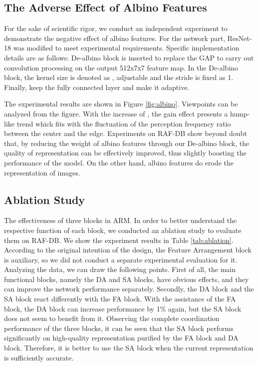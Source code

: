 \documentclass[10pt,twocolumn,letterpaper]{article}
\begin{document}
\subsection{The Adverse Effect of Albino Features}

	For the sake of scientific rigor, we conduct an independent experiment to demonstrate the negative effect of albino features. For the network part, ResNet-18 \cite{resnet} was modified to meet experimental requirements. Specific implementation details are as follows: De-albino block is inserted to replace the GAP to carry out convolution processing on the output 512x7x7 feature map. In the De-albino block, the kernel size is denoted as , adjustable and the stride is fixed as 1. Finally, keep the fully connected layer and make it adaptive. 

	The experimental results are shown in Figure \ref{fig:albino}. Viewpoints can be analyzed from the figure. With the increase of , the gain effect presents a hump-like trend which fits with the fluctuation of the perception frequency ratio between the center and the edge. Experiments on RAF-DB show beyond doubt that, by reducing the weight of albino features through our De-albino block, the quality of representation can be effectively improved, thus slightly boosting the performance of the model. On the other hand, albino features do erode the representation of images.








\subsection{Ablation Study}
	The effectiveness of three blocks in ARM. In order to better understand the respective function of each block, we conducted an ablation study to evaluate them on RAF-DB. We show the experiment results in Table \ref{tab:ablation}. According to the original intention of the design, the Feature Arrangement block is auxiliary, so we did not conduct a separate experimental evaluation for it. Analyzing the data, we can draw the following points. First of all, the main functional blocks, namely the DA and SA blocks, have obvious effects, and they can improve the network performance separately. Secondly, the DA block and the SA block react differently with the FA block. With the assistance of the FA block, the DA block can increase performance by 1\% again, but the SA block does not seem to benefit from it. Observing the complete coordination performance of the three blocks, it can be seen that the SA block performs significantly on high-quality representation purified by the FA block and DA block. Therefore, it is better to use the SA block when the current representation is sufficiently accurate. 
\end{document}
